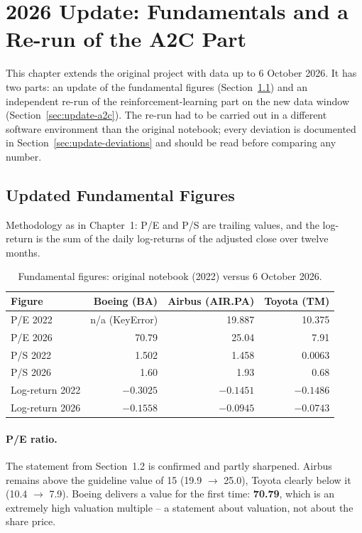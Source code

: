 \section{2026 Update: Fundamentals and a Re-run of the A2C Part}

This chapter extends the original project with data up to 6 October 2026. It has two parts:
an update of the fundamental figures (Section~\ref{sec:update-fundamentals}) and an
independent re-run of the reinforcement-learning part on the new data window
(Section~\ref{sec:update-a2c}). The re-run had to be carried out in a different software
environment than the original notebook; every deviation is documented in
Section~\ref{sec:update-deviations} and should be read before comparing any number.

\subsection{Updated Fundamental Figures}
\label{sec:update-fundamentals}

Methodology as in Chapter~1: P/E and P/S are trailing values, and the log-return is the sum
of the daily log-returns of the adjusted close over twelve months.

\begin{table}[H]
  \centering
  \caption{Fundamental figures: original notebook (2022) versus 6 October 2026.}
  \label{tab:update-fundamentals}
  \begin{tabular}{lrrr}
    \toprule
    Figure & Boeing (BA) & Airbus (AIR.PA) & Toyota (TM)\\
    \midrule
    P/E 2022        & n/a (KeyError) & 19.887 & 10.375\\
    P/E 2026        & 70.79          & 25.04  & 7.91\\
    P/S 2022        & 1.502          & 1.458  & 0.0063\\
    P/S 2026        & 1.60           & 1.93   & 0.68\\
    Log-return 2022 & $-0.3025$      & $-0.1451$ & $-0.1486$\\
    Log-return 2026 & $-0.1558$      & $-0.0945$ & $-0.0743$\\
    \bottomrule
  \end{tabular}
\end{table}

\paragraph{P/E ratio.} The statement from Section~1.2 is confirmed and partly sharpened.
Airbus remains above the guideline value of 15 (19.9 $\rightarrow$ 25.0), Toyota clearly
below it (10.4 $\rightarrow$ 7.9). Boeing delivers a value for the first time: \textbf{70.79},
which is an extremely high valuation multiple -- a statement about valuation, not about the
share price.

